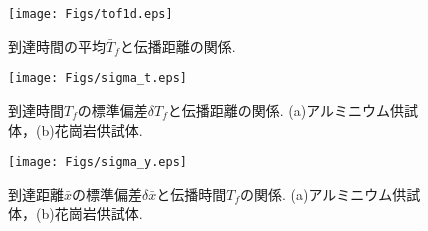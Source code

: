 \begin{figure}
\begin{center}
	\texttt{[image: Figs/tof1d.eps]}
	\caption{到達時間の平均$\bar T_f$と伝播距離の関係. }
	\label{fig:fig12}
\end{center}
\end{figure}
\begin{figure}
\begin{center}
	\texttt{[image: Figs/sigma\_t.eps]}
	\caption{到達時間$T_f$の標準偏差$\delta T_f$と伝播距離の関係. (a)アルミニウム供試体，(b)花崗岩供試体.}
	\label{fig:fig13}
\end{center}
\end{figure}
\begin{figure}
\begin{center}
	\texttt{[image: Figs/sigma\_y.eps]}
	\caption{到達距離$\bar{x}$の標準偏差$\delta \bar{x}$と伝播時間$T_f$の関係. (a)アルミニウム供試体，(b)花崗岩供試体.}
	\label{fig:fig14}
\end{center}
\end{figure}
